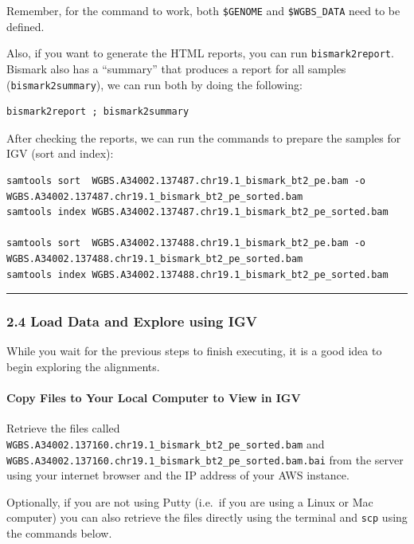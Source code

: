 \documentclass[
]{book}
\begin{document}
Remember, for the command to work, both \texttt{\$GENOME} and \texttt{\$WGBS\_DATA} need to be defined.

Also, if you want to generate the HTML reports, you can run \texttt{bismark2report}. Bismark also has a ``summary'' that produces a report for all samples (\texttt{bismark2summary}), we can run both by doing the following:

\begin{verbatim}
bismark2report ; bismark2summary
\end{verbatim}

After checking the reports, we can run the commands to prepare the samples for IGV (sort and index):

\begin{verbatim}
samtools sort  WGBS.A34002.137487.chr19.1_bismark_bt2_pe.bam -o WGBS.A34002.137487.chr19.1_bismark_bt2_pe_sorted.bam
samtools index WGBS.A34002.137487.chr19.1_bismark_bt2_pe_sorted.bam

samtools sort  WGBS.A34002.137488.chr19.1_bismark_bt2_pe.bam -o WGBS.A34002.137488.chr19.1_bismark_bt2_pe_sorted.bam
samtools index WGBS.A34002.137488.chr19.1_bismark_bt2_pe_sorted.bam
\end{verbatim}

\begin{center}\rule{0.5\linewidth}{0.5pt}\end{center}

\subsubsection{2.4 Load Data and Explore using IGV}\label{load-data-and-explore-using-igv}

While you wait for the previous steps to finish executing, it is a good idea to begin exploring the alignments.

\paragraph{Copy Files to Your Local Computer to View in IGV}\label{copy-files-to-your-local-computer-to-view-in-igv}

Retrieve the files called \texttt{WGBS.A34002.137160.chr19.1\_bismark\_bt2\_pe\_sorted.bam} and \texttt{WGBS.A34002.137160.chr19.1\_bismark\_bt2\_pe\_sorted.bam.bai} from the server using your internet browser and the IP address of your AWS instance.

Optionally, if you are not using Putty (i.e.~if you are using a Linux or Mac computer) you can also retrieve the files directly using the terminal and \texttt{scp} using the commands below.
\end{document}
